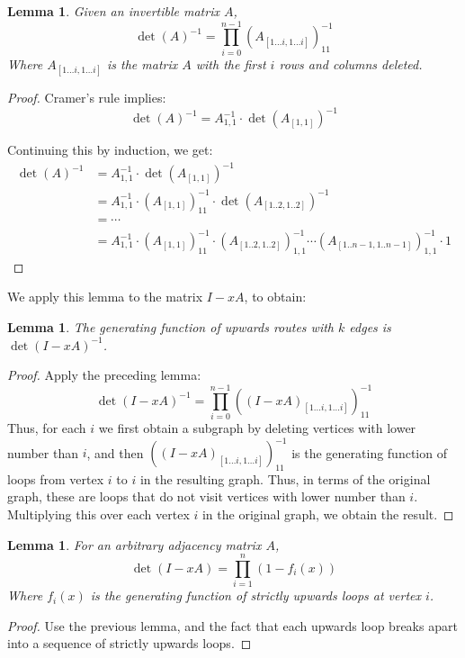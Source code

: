 \documentclass[a4paper, 11pt]{article}
\newtheorem{lemma}[theorem]{Lemma}
\theoremstyle{definition}
\begin{document}
\begin{lemma} Given an invertible matrix $A$,
  \[ \det(A)^{-1} = \prod_{i=0}^{n-1} (A_{[1\dots i, 1\dots i]})^{-1}_{11} \]
Where $A_{[1\dots i, 1\dots i]}$ is the matrix $A$ with the first $i$ rows and columns deleted.
\end{lemma}
\begin{proof}
  Cramer's rule implies:
\[
  \det(A)^{-1} = A^{-1}_{1,1} \cdot \det(A_{[1,1]})^{-1}
\]

Continuing this by induction, we get:
\begin{align*}
  \det(A)^{-1} &= A^{-1}_{1,1} \cdot \det(A_{[1,1]})^{-1} \\
    &= A^{-1}_{1,1} \cdot (A_{[1,1]})^{-1}_{11} \cdot \det(A_{[1..2,1..2]})^{-1} \\
    &= \cdots \\
    &= A^{-1}_{1,1} \cdot (A_{[1,1]})^{-1}_{11} \cdot (A_{[1..2,1..2]})^{-1}_{1,1} \cdots
        (A_{[1..n-1,1..n-1]})^{-1}_{1,1} \cdot 1
\end{align*}
\end{proof}

We apply this lemma to the matrix $I - xA$, to obtain:

\begin{lemma}
  The generating function of upwards routes with $k$ edges is $\det(I - xA)^{-1}$.
\end{lemma}
\begin{proof}
  Apply the preceding lemma:
  \[ \det(I - xA)^{-1} = \prod_{i=0}^{n-1} ((I - xA)_{[1\dots i, 1\dots i]})^{-1}_{11} \]
  Thus, for each $i$ we first obtain a subgraph by deleting vertices with lower number than $i$, and then $((I - xA)_{[1\dots i, 1\dots i]})^{-1}_{11}$ is the generating function of loops from vertex $i$ to $i$ in the resulting graph. Thus, in terms of the original graph, these are loops that do not visit vertices with lower number than $i$. Multiplying this over each vertex $i$ in the original graph, we obtain the result.
\end{proof}

\begin{lemma} For an arbitrary adjacency matrix $A$,
  \[ \det(I - xA) = \prod_{i = 1}^n (1 - f_i(x)) \]
  Where $f_i(x)$ is the generating function of strictly upwards loops at vertex $i$.
\end{lemma}
\begin{proof}
  Use the previous lemma, and the fact that each upwards loop breaks apart into a sequence of strictly upwards loops.
\end{proof}
\end{document}
